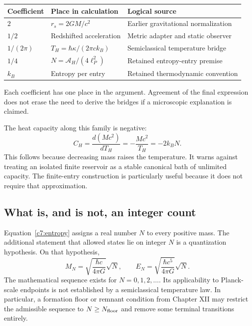 \begin{center}
\small
\begin{tabularx}{\linewidth}{@{}lXX@{}}
\toprule
Coefficient & Place in calculation & Logical source\\
\midrule
$2$ & $r_s=2GM/c^2$ & Earlier gravitational normalization\\
$1/2$ & Redshifted acceleration & Metric adapter and static observer\\
$1/(2\pi)$ & $T_H=\hbar\kappa/(2\pi ck_B)$ & Semiclassical temperature bridge\\
$1/4$ & $N=\mathcal A_H/(4\ell_P^2)$ & Retained entropy-entry premise\\
$k_B$ & Entropy per entry & Retained thermodynamic convention\\
\bottomrule
\end{tabularx}
\end{center}
Each coefficient has one place in the argument. Agreement of the final expression does not erase the need to derive the bridges if a microscopic explanation is claimed.

The heat capacity along this family is negative:
\begin{equation}
 C_H=\frac{d(Mc^2)}{dT_H}
 =-\frac{Mc^2}{T_H}=-2k_BN.
 \label{c7:heatcapacity}
\end{equation}
This follows because decreasing mass raises the temperature. It warns against treating an isolated finite reservoir as a stable canonical bath of unlimited capacity. The finite-entry construction is particularly useful because it does not require that approximation.

\subsection{What is, and is not, an integer count}
Equation~\eqref{c7:entropy} assigns a real number $N$ to every positive mass. The additional statement that allowed states lie on integer $N$ is a quantization hypothesis. On that hypothesis,
\begin{equation}
 M_N=\sqrt{\frac{\hbar c}{4\pi G}}\sqrt N,
 \qquad E_N=\sqrt{\frac{\hbar c^5}{4\pi G}}\sqrt N.
 \label{c7:levels}
\end{equation}
The mathematical sequence exists for $N=0,1,2,\ldots$. Its applicability to Planck-scale endpoints is not established by a semiclassical temperature law. In particular, a formation floor or remnant condition from Chapter XII may restrict the admissible sequence to $N\ge N_{\rm floor}$ and remove some terminal transitions entirely.

